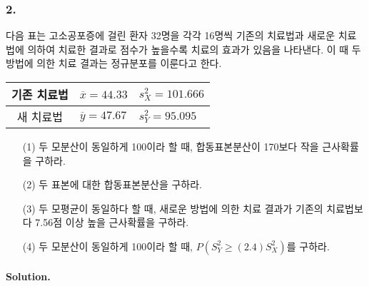 \subsubsection{2.} 다음 표는 고소공포증에 걸린 환자 32명을 각각 16명씩 기존의 치료법과 새로운 치료법에 의하여 치료한 결과로
점수가 높을수록 치료의 효과가 있음을 나타낸다. 이 때 두 방법에 의한 치료 결과는 정규분포를 이룬다고 한다.

\begin{center}
    \begin{tabular}{c|ll}
        \hline
        기존 치료법 & $\overline{x} = 44.33$ & $s_X^2 = 101.666$ \\
        \hline
        새 치료법 & $\overline{y} = 47.67$ & $s_Y^2 = 95.095$ \\
        \hline
    \end{tabular}
\end{center}

\begin{itemize}
    \item[(1)] 두 모분산이 동일하게 100이라 할 때, 합동표본분산이 170보다 작을 근사확률을 구하라.
    \item[(2)] 두 표본에 대한 합동표본분산을 구하라.
    \item[(3)] 두 모평균이 동일하다 할 때, 새로운 방법에 의한 치료 결과가 기존의 치료법보다 7.56점 이상 높을 근사확률을 구하라.
    \item[(4)] 두 모분산이 동일하게 100이라 할 때, $P\left(S_Y^2 \geq \left(2.4\right)S_X^2\right)$를 구하라.   
\end{itemize}

\paragraph{Solution.}

